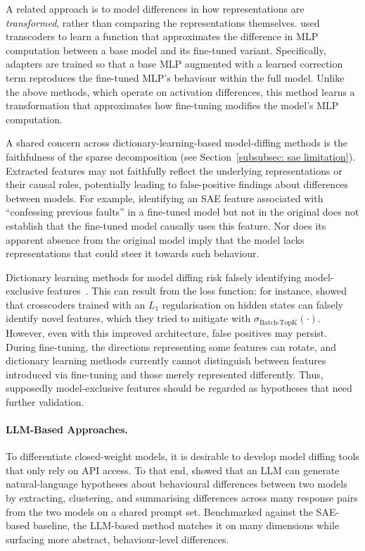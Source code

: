A related approach is to model differences in how representations are \emph{transformed}, rather than comparing the representations themselves.  used transcoders to learn a function that approximates the difference in MLP computation between a base model and its fine-tuned variant. Specifically, adapters are trained so that a base MLP augmented with a learned correction term reproduces the fine-tuned MLP's behaviour within the full model. Unlike the above methods, which operate on activation differences, this method learns a transformation that approximates how fine-tuning modifies the model's MLP computation. 

A shared concern across dictionary-learning-based model-diffing methods is the faithfulness of the sparse decomposition (see Section~\ref{subsubsec: sae limitation}). Extracted features may not faithfully reflect the underlying representations or their causal roles, potentially leading to false-positive findings about differences between models. For example, identifying an SAE feature associated with ``confessing previous faults'' in a fine-tuned model but not in the original does not establish that the fine-tuned model causally uses this feature. Nor does its apparent absence from the original model imply that the model lacks representations that could steer it towards such behaviour.

\begin{warningbox}

Dictionary learning methods for model diffing risk falsely identifying model-exclusive features~. This can result from the loss function: for instance,  showed that crosscoders trained with an $L_1$ regularisation on hidden states can falsely identify novel features, which they tried to mitigate with $\sigma_{\text{Batch-TopK}}(\cdot)$. However, even with this improved architecture, false positives may persist. During fine-tuning, the directions representing some features can rotate, and dictionary learning methods currently cannot distinguish between features introduced via fine-tuning and those merely represented differently. Thus, supposedly model-exclusive features should be regarded as hypotheses that need further validation. 
\end{warningbox} 

\paragraph{LLM-Based Approaches.} To differentiate closed-weight models, it is desirable to develop model diffing tools that only rely on API access. To that end,  showed that an LLM can generate natural-language hypotheses about behavioural differences between two models by extracting, clustering, and summarising differences across many response pairs from the two models on a shared prompt set. Benchmarked against the SAE-based baseline, the LLM-based method matches it on many dimensions while surfacing more abstract, behaviour-level differences.

